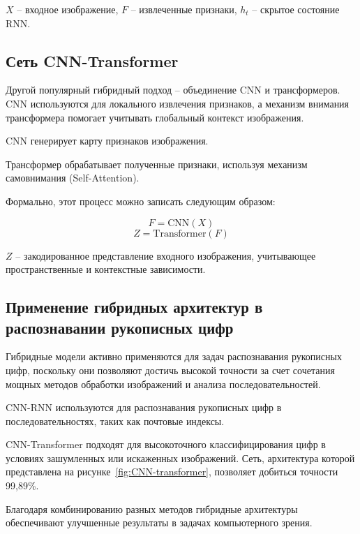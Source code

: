  $X$ – входное изображение, $F$ – извлеченные признаки, $h_t$ – скрытое 
состояние RNN.\@

\subsection{Сеть CNN-Transformer}
\hspace*{12.5 mm}Другой популярный гибридный подход – объединение CNN и 
трансформеров. CNN используются для локального извлечения признаков, а механизм
внимания трансформера помогает учитывать глобальный контекст изображения.

CNN генерирует карту признаков изображения.

Трансформер обрабатывает полученные признаки, используя механизм самовнимания 
(Self-Attention).

Формально, этот процесс можно записать следующим образом:

\begin{equation}
    F = \text{CNN}(X)
\end{equation}
\begin{equation}
    Z = \text{Transformer}(F)
\end{equation}

 $Z$ – закодированное представление входного изображения, учитывающее 
пространственные и контекстные зависимости.

\subsection{Применение гибридных архитектур в распознавании рукописных цифр}
\hspace*{12.5 mm}
Гибридные модели активно применяются для задач распознавания рукописных цифр, 
поскольку они позволяют достичь высокой точности за счет сочетания мощных 
методов обработки изображений и анализа последовательностей. 

    CNN-RNN используются для распознавания рукописных цифр в 
последовательностях, таких как почтовые индексы.

    CNN-Transformer подходят для высокоточного классифицирования цифр в 
условиях зашумленных или искаженных изображений. Сеть, архитектура которой 
представлена на рисунке~\ref{fig:CNN-transformer}, позволяет добиться 
точности 99,89\%\cite{Performance}.


Благодаря комбинированию разных методов гибридные архитектуры обеспечивают 
улучшенные результаты в задачах компьютерного зрения.